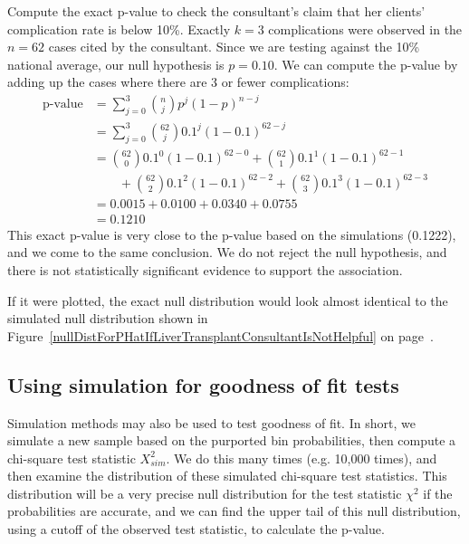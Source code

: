 \begin{example}{Compute the exact p-value to check the consultant's claim that her clients' complication rate is below 10\%.}
Exactly $k=3$ complications were observed in the $n=62$ cases cited by the consultant. Since we are testing against the 10\% national average, our null hypothesis is $p=0.10$. We can compute the p-value by adding up the cases where there are 3 or fewer complications:
\begin{align*}
\text{p-value}
	&= \sum_{j=0}^{3} {n\choose j} p^{j}(1-p)^{n-j} \\
	&= \sum_{j=0}^{3} {62\choose j} 0.1^{j}(1-0.1)^{62-j} \\
	&= {62\choose 0} 0.1^{0}(1-0.1)^{62-0} +
		{62\choose 1} 0.1^{1}(1-0.1)^{62-1} \\
	& \qquad + {62\choose 2} 0.1^{2}(1-0.1)^{62-2} +
		{62\choose 3} 0.1^{3}(1-0.1)^{62-3} \\
	&= 0.0015 + 0.0100 + 0.0340 + 0.0755 \\
	&= 0.1210
\end{align*}
This exact p-value is very close to the p-value based on the simulations (0.1222), and we come to the same conclusion. We do not reject the null hypothesis, and there is not statistically significant evidence to support the association.

If it were plotted, the exact null distribution would look almost identical to the simulated null distribution shown in Figure~\ref{nullDistForPHatIfLiverTransplantConsultantIsNotHelpful} on page~\pageref{nullDistForPHatIfLiverTransplantConsultantIsNotHelpful}.
\end{example}


\subsection{Using simulation for goodness of fit tests}

Simulation methods may also be used to test goodness of fit. In short, we simulate a new sample based on the purported bin probabilities, then compute a chi-square test statistic $X_{sim}^2$. We do this many times (e.g. 10,000 times), and then examine the distribution of these simulated chi-square test statistics. This distribution will be a very precise null distribution for the test statistic $\chi^2$ if the probabilities are accurate, and we can find the upper tail of this null distribution, using a cutoff of the observed test statistic, to calculate the p-value.

